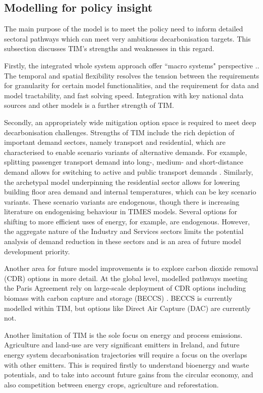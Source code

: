 \documentclass[journal abbreviation, manuscript]{copernicus}
\begin{document}
\subsection{Modelling for policy insight}
The main purpose of the model is to meet the policy need to inform detailed sectoral pathways which can meet very ambitious decarbonisation targets. This subsection discusses TIM's strengths and weaknesses in this regard. 

Firstly, the integrated whole system approach offer ``macro systems" perspective .. The temporal and spatial flexibility resolves the tension between the requirements for granularity for certain model functionalities, and the requirement for data and model tractability, and fast solving speed. Integration with key national data sources and other models is a further strength of TIM. 

Secondly, an appropriately wide mitigation option space is required to meet deep decarbonisation challenges. Strengths of TIM include the rich depiction of important demand sectors, namely transport and residential, which are characterised to enable scenario variants of alternative demands. For example, splitting passenger transport demand into long-, medium- and short-distance demand allows for switching to active and public transport demands . Similarly, the archetypal model underpinning the residential sector allows for lowering building floor area demand and internal temperatures, which can be key scenario variants. These scenario variants are endogenous, though there is increasing literature on endogenising behaviour in TIMES models. Several options for shifting to more efficient uses of energy, for example, are endogenous. However, the aggregate nature of the Industry and Services sectors limits the potential analysis of demand reduction in these sectors and is an area of future model development priority.

Another area for future model improvements is to explore carbon dioxide removal (CDR) options in more detail. At the global level, modelled pathways meeting the Paris Agreement rely on large-scale deployment of CDR options including biomass with carbon capture and storage (BECCS) \citep{IPCC2018}. BECCS is currently modelled within TIM, but options like Direct Air Capture (DAC)\citep{Realmonte2019} are currently not.

Another limitation of TIM is the sole focus on energy and process emissions. Agriculture and land-use are very significant emitters in Ireland, and future energy system decarbonisation trajectories will require a focus on the overlaps with other emitters. This is required firstly to understand bioenergy and waste potentials, and to take into account future gains from the circular economy, and also competition between energy crops, agriculture and reforestation.
\end{document}
